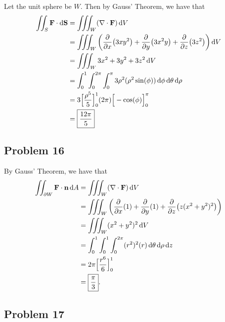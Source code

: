 \documentclass[11pt]{article}
\renewcommand{\vec}[1]{\mathbf{#1}}
\renewcommand{\div}{\nabla \cdot}
\begin{document}
Let the unit sphere be $W$. Then by Gauss' Theorem, we have that
\begin{align*}
	\iint_{S} \mathbf{F} \cdot \dd{\vec{S}} &= \iiint_{W} (\div \mathbf{F}) \dd{V} \\
	&= \iiint_{W} \left( \pdv{x} (3xy^{2}) + \pdv{y} (3x^{2}y) + \pdv{z} (3z^{2}) \right) \dd{V} \\
	&= \iiint_{W} 3x^{2} + 3y^{2} + 3z^{2} \dd{V} \\
	&= \int_{0}^{1} \int_{0}^{2\pi} \int_{0}^{\pi} 3\rho^{2} (\rho^{2} \sin(\phi)) \dd{\phi} \dd{\theta} \dd{\rho} \\
	&= 3 \Big[ \frac{\rho^{5}}{5} \Big]_{0}^{1} (2\pi) \Big[ -\cos(\phi) \Big]_{0}^{\pi} \\
	&= \boxed{\frac{12\pi}{5}}
\end{align*}




\subsection*{Problem 16}

By Gauss' Theorem, we have that
\begin{align*}
	\iint_{\partial W} \mathbf{F} \cdot \vec{n}\dd{A} &= \iiint_{W} (\div \mathbf{F}) \dd{V} \\
	&= \iiint_{W} \left( \pdv{x} (1) + \pdv{y} (1) + \pdv{z} (z(x^{2} + y^{2})^{2}) \right) \\
	&= \iiint_{W} (x^{2} + y^{2})^{2} \dd{V} \\
	&= \int_{0}^{1} \int_{0}^{1} \int_{0}^{2\pi} (r^{2})^{2}(r) \dd{\theta} \dd{\rho} \dd{z} \\
	&= 2\pi \Big[ \frac{r^{6}}{6} \Big]_{0}^{1} \\
	&= \boxed{\frac{\pi}{3}}.
\end{align*}


\subsection*{Problem 17}
\end{document}
